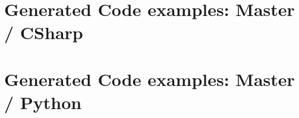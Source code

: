 \documentclass[a4paper,pdftex]{paper}
\begin{document}



\section{Generated Code examples: Master / CSharp}
\label{sec:gen_out_cs}



\section{Generated Code examples: Master / Python}
\label{sec:gen_out_py}


\end{document}
